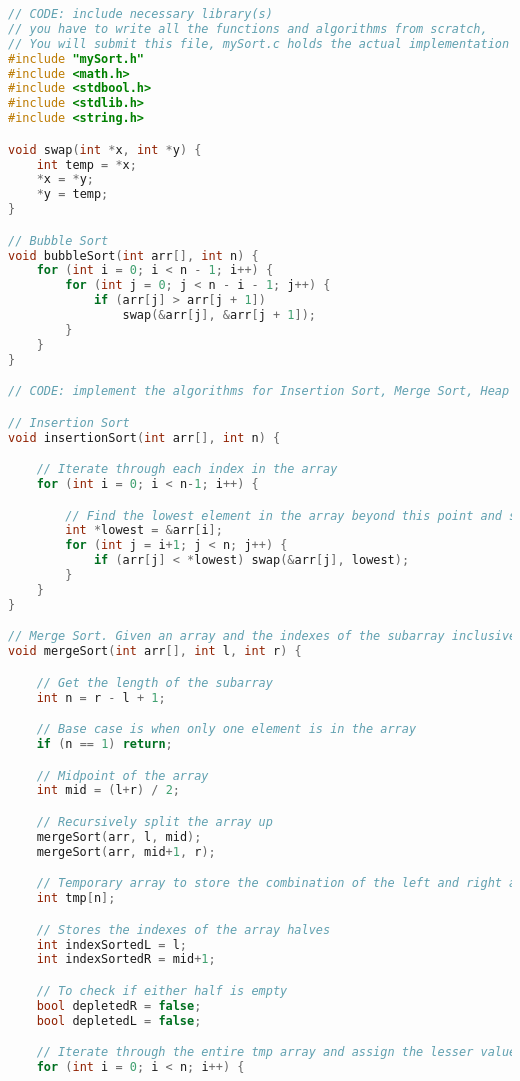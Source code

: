 \documentclass[12pt]{article}
\begin{document}
\begin{lstlisting}[language=c]
// CODE: include necessary library(s)
// you have to write all the functions and algorithms from scratch,
// You will submit this file, mySort.c holds the actual implementation of sorting functions
#include "mySort.h"
#include <math.h>
#include <stdbool.h>
#include <stdlib.h>
#include <string.h>

void swap(int *x, int *y) {
    int temp = *x;
    *x = *y;
    *y = temp;
}

// Bubble Sort
void bubbleSort(int arr[], int n) {
    for (int i = 0; i < n - 1; i++) {
        for (int j = 0; j < n - i - 1; j++) {
            if (arr[j] > arr[j + 1])
                swap(&arr[j], &arr[j + 1]);
        }
    }
}

// CODE: implement the algorithms for Insertion Sort, Merge Sort, Heap Sort, Counting Sort

// Insertion Sort
void insertionSort(int arr[], int n) {

	// Iterate through each index in the array
	for (int i = 0; i < n-1; i++) { 

		// Find the lowest element in the array beyond this point and swap it with the initial point
		int *lowest = &arr[i];
		for (int j = i+1; j < n; j++) {
			if (arr[j] < *lowest) swap(&arr[j], lowest);
		}
	}
}

// Merge Sort. Given an array and the indexes of the subarray inclusive
void mergeSort(int arr[], int l, int r) {

	// Get the length of the subarray
	int n = r - l + 1;

	// Base case is when only one element is in the array
	if (n == 1) return;

	// Midpoint of the array
	int mid = (l+r) / 2;

	// Recursively split the array up
	mergeSort(arr, l, mid);
	mergeSort(arr, mid+1, r);

	// Temporary array to store the combination of the left and right arrays, both of which should be in sorted form individually
	int tmp[n];

	// Stores the indexes of the array halves
	int indexSortedL = l;
	int indexSortedR = mid+1;

	// To check if either half is empty
	bool depletedR = false;
	bool depletedL = false;

	// Iterate through the entire tmp array and assign the lesser value between the left and right half
	for (int i = 0; i < n; i++) {


\end{lstlisting}
\end{document}

